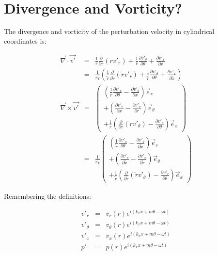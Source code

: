 \section{Divergence and Vorticity?}

The divergence and vorticity of the perturbation velocity in cylindrical
coordinates is:

\begin{eqnarray}
\vec{\nabla} \cdot \vec{v'} &=&
\frac{1}{r}
\frac{\partial}{\partial r} \left( r v'_r \right)
+ \frac{1}{r} \frac{\partial v'_{\theta}}{\partial \theta}
+ \frac{\partial v'_{x}}{\partial x}
\nonumber
\\
&=&
\frac{1}{r_T}
\left(
\frac{1}{\widetilde{r}}
\frac{\partial}{\partial \widetilde{r}} 
\left( \widetilde{r} v'_r \right)
+ 
 \frac{1}{\widetilde{r}} 
\frac{\partial v'_{\theta}}{\partial \theta}
+ 
 \frac{\partial v'_{x}}{\partial \widetilde{x}}
\right)
\nonumber
\\
\vec{\nabla} \times \vec{v'}
&=&
\left(
\begin{array}{r}
\left(
\frac{1}{r} \frac{\partial v'_x}{\partial \theta}
-\frac{\partial v'_{\theta}}{\partial x} 
\right) \vec{e}_r
\\
+\left(
\frac{\partial v'_r}{\partial x}
-\frac{\partial v'_x}{\partial r}
\right) \vec{e}_{\theta}
\\
+
\frac{1}{r} 
\left(
  \frac{\partial}{\partial r} \left(r v'_{\theta} \right)
- \frac{\partial v'_r}{\partial \theta}
\right) \vec{e}_x
\end{array}
\right)
\nonumber
\\
&=&
\frac{1}{r_T}
\left(
\begin{array}{r}
\left(
\frac{1}{\widetilde{r}} \frac{\partial v'_x}{\partial \theta}
-\frac{\partial v'_{\theta}}{\partial \widetilde{x}} 
\right) \vec{e}_r
\\
+\left(
\frac{\partial v'_r}{\partial \widetilde{x}}
-\frac{\partial v'_x}{\partial \widetilde{r}}
\right) \vec{e}_{\theta}
\\
+
\frac{1}{\widetilde{r}} 
\left(
  \frac{\partial}{\partial \widetilde{r}} \left(\widetilde{r} v'_{\theta} \right)
- \frac{\partial v'_r}{\partial \theta}
\right) \vec{e}_x
\end{array}
\right)
\nonumber
\end{eqnarray}

Remembering the definitions:

\begin{eqnarray}
v'_r &=& v_r \left(r \right) e^{i \left(k_x x + m \theta - \omega t \right)}
\nonumber
\\
v'_{\theta} &=& v_{\theta} \left(r \right) e^{i \left(k_x x + m \theta - \omega t \right)}
\nonumber
\\
v'_x &=& v_x \left(r \right) e^{i \left(k_x x + m \theta - \omega t \right)}
\nonumber
\\
p' &=& p \left(r \right) e^{i \left(k_x x + m \theta - \omega t \right)}
\nonumber
\end{eqnarray}

